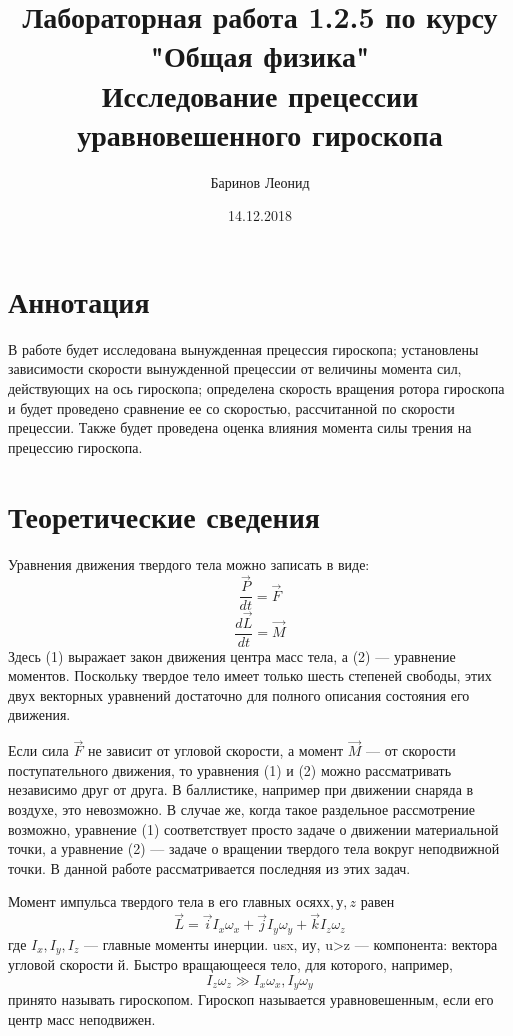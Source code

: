 \documentclass[a4paper,12pt]{article} %
\title{Лабораторная работа 1.2.5 по курсу \\ "Общая физика"  \\ 
\vspace{0.2cm}
\vspace{4.5cm}
 \LARGE{\textbf{Исследование прецессии уравновешенного гироскопа}}\vspace{5.5cm}}
\date{14.12.2018}
\author{\vspace{0.2cm}Баринов Леонид}
\begin{document}
\maketitle
\newpage
\section{Аннотация}
В работе будет исследована вынужденная прецессия гироскопа; установлены зависимости скорости вынужденной прецессии от величины момента сил, действующих на ось гироскопа; определена скорость вращения ротора гироскопа и будет проведено сравнение ее со скоростью, рассчитанной по скорости прецессии. Также будет проведена оценка влияния момента силы трения на прецессию гироскопа.
\section{Теоретические сведения}
Уравнения движения твердого тела можно записать в виде:
\begin{equation}
\frac{\overrightarrow{P}}{dt} = \overrightarrow{F}
\end{equation}
\begin{equation}
\frac{d\overrightarrow{L}}{dt} = \overrightarrow{M}
\end{equation}
Здесь (1) выражает закон движения центра масс тела, а (2) — уравнение моментов. Поскольку твердое тело имеет только шесть степеней свободы, этих двух векторных уравнений достаточно для полного описания состояния его движения.

Если сила $\overrightarrow{F}$ не зависит от угловой скорости, а момент $\overrightarrow{M}$ — от скорости поступательного движения, то уравнения (1) и (2) можно рассматривать независимо друг от друга. В баллистике, например при движении снаряда в воздухе, это невозможно. В случае же, когда такое раздельное рассмотрение возможно, уравнение (1) соответствует просто задаче о движении материальной точки, а уравнение (2) — задаче о вращении твердого тела вокруг неподвижной точки. В данной работе рассматривается последняя из этих задач.

Момент импульса твердого тела в его главных осях$ х, у, z$ равен
\begin{equation}
\overrightarrow{L} = \overrightarrow{i}I_x\omega_x+\overrightarrow{j}I_y\omega_y + \overrightarrow{k}I_z\omega_z
\end{equation}
где $I_x, I_y, I_z$ — главные моменты инерции. usx, иу, u>z — компонента: вектора угловой скорости й. Быстро вращающееся тело, для которого, например,
\[I_z\omega_z \gg I_x\omega_x, I_y\omega_y\]
принято называть гироскопом. Гироскоп называется уравновешенным, если его центр масс неподвижен.
\end{document}

